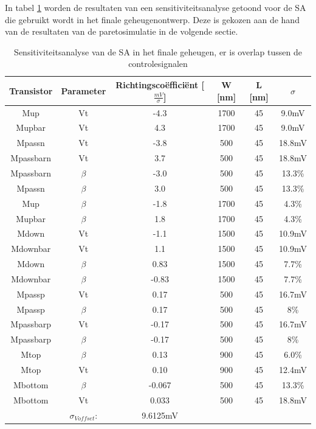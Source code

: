In tabel \ref{tab:ourSA-sensanalysis-overlap} worden de resultaten van een sensitiviteitsanalyse getoond voor de SA die gebruikt wordt in het finale geheugenontwerp. Deze is gekozen aan de hand van de resultaten van de paretosimulatie in de volgende sectie.


\begin{table}
\begin{tabular}{cccccc}
\hline 
Transistor & Parameter & Richtingscoëfficiënt [$\frac{mV}{\sigma}$] & W [nm] & L [nm] & $\sigma$ \\ 
\hline 
Mup & Vt & -4.3 & 1700 & 45 & 9.0mV \\ 
Mupbar & Vt & 4.3 & 1700 & 45 & 9.0mV \\ 
Mpassn & Vt & -3.8 & 500 & 45 & 18.8mV \\
Mpassbarn & Vt & 3.7 & 500 & 45 & 18.8mV \\
Mpassbarn & $\beta$ & -3.0 & 500 & 45 & 13.3\% \\ 
Mpassn & $\beta$ & 3.0 & 500 & 45 & 13.3\% \\ 
Mup & $\beta$ & -1.8 & 1700 & 45 & 4.3\% \\ 
Mupbar & $\beta$ & 1.8 & 1700 & 45 & 4.3\% \\ 
Mdown & Vt & -1.1 & 1500 & 45 & 10.9mV \\ 
Mdownbar & Vt & 1.1 & 1500 & 45 & 10.9mV \\
Mdown & $\beta$ & 0.83 & 1500 & 45 & 7.7\% \\
Mdownbar & $\beta$ & -0.83 & 1500 & 45 & 7.7\% \\  
Mpassp & Vt & 0.17 & 500 & 45 & 16.7mV \\ 
Mpassp & $\beta$ & 0.17 & 500 & 45 & 8\% \\ 
Mpassbarp & Vt & -0.17 & 500 & 45 & 16.7mV \\
Mpassbarp & $\beta$ & -0.17 & 500 & 45 & 8\% \\ 
Mtop & $\beta$ & 0.13 & 900 & 45 & 6.0\% \\ 
Mtop & Vt & 0.10 & 900 & 45 & 12.4mV \\ 
Mbottom & $\beta$ & -0.067 & 500 & 45 & 13.3\% \\ 
Mbottom & Vt & 0.033 & 500 & 45 & 18.8mV \\ 
\hline 
\hline & $\sigma_{Voffset}$: & 9.6125mV & & & \\
\hline
\end{tabular} 
\caption[Sensitiviteitsanalyse van de SA in het finale geheugen]{Sensitiviteitsanalyse van de SA in het finale geheugen, er is overlap tussen de controlesignalen}
\label{tab:ourSA-sensanalysis-overlap}
\end{table}

